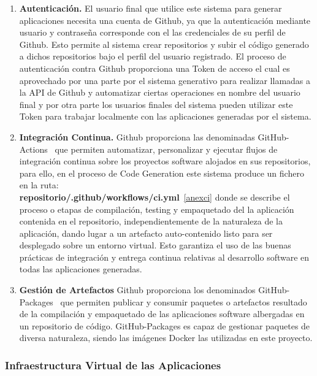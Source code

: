\documentclass[a4paper,11pt]{book}
\begin{document}
\begin{enumerate}
\item \textbf{ Autenticación.} El usuario final que utilice este sistema para generar aplicaciones necesita una cuenta de Github, ya que la autenticación mediante usuario y contraseña corresponde con el las credenciales  de su perfil de Github. Esto permite al sistema crear repositorios y subir el código generado a dichos repositorios bajo el perfil del usuario registrado. El proceso de autenticación contra Github proporciona una Token  de acceso el cual es aprovechado por una parte por el sistema generativo para realizar llamadas a la API  de Github y automatizar ciertas operaciones en nombre del usuario final y por otra parte los usuarios finales del sistema  pueden utilizar este Token para trabajar localmente con las aplicaciones generadas por el sistema.

\item   \textbf{Integración Continua.} Github proporciona las denominadas GitHub-Actions~\cite{github3}  que permiten automatizar, personalizar y ejecutar flujos de integración continua  sobre los proyectos software alojados en sus repositorios, para ello, en el proceso de Code Generation este sistema produce un fichero  en la ruta:\\
\textbf{repositorio/.github/workflows/ci.yml}~\ref{anexci} donde se describe el proceso o etapas de compilación, testing y empaquetado del la aplicación contenida en el repositorio, independientemente de la naturaleza de la aplicación, dando lugar a un artefacto auto-contenido listo para ser desplegado sobre un entorno virtual. Esto garantiza el uso de las buenas prácticas  de integración y entrega continua relativas al desarrollo software en todas las aplicaciones generadas.

\item \textbf{Gestión de Artefactos} Github proporciona los denominados GitHub-Packages~\cite{github4} que permiten publicar y consumir paquetes o artefactos resultado de la compilación y empaquetado de las aplicaciones software albergadas en un repositorio de código. GitHub-Packages es capaz de gestionar paquetes de diversa naturaleza, siendo las imágenes Docker las utilizadas en este proyecto.
\end{enumerate}

\subsubsection{Infraestructura Virtual de las Aplicaciones}\label{infra}
\end{document}
